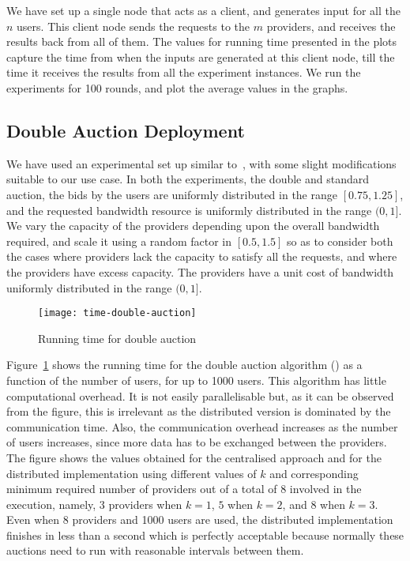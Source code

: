 We have set up a single node that acts as a client, and generates input for all the $n$ users.
This client node sends the requests to the $m$ providers, and receives the results back from all of them.
The values for running time presented in the plots capture the time from when the inputs are generated at this client node,
till the time it receives the results from all the experiment instances.
We run the experiments for 100 rounds, and plot the average values in the graphs.

\subsection{Double Auction Deployment}

We have used an experimental set up similar to~\cite{Zheng2014Star}, with some slight modifications suitable to our use case.
In both the experiments, the double and standard auction, 
the bids by the users are uniformly distributed in the range $[0.75, 1.25]$,
and the requested bandwidth resource is uniformly distributed in the range $(0, 1]$.
We vary the capacity of the providers depending upon the overall bandwidth required, and scale it using a random factor in $[0.5, 1.5]$ so as to consider both the cases where providers lack the capacity to satisfy all the requests, and where the providers have excess capacity.
The providers have a unit cost of bandwidth uniformly distributed in the range $(0, 1]$.

\begin{figure}[tbp]
	\centering
	\texttt{[image: time-double-auction]}
	\caption{Running time for double auction}
	\label{fig:double-auction-time}
\end{figure}

Figure~\ref{fig:double-auction-time} shows the running time for the double auction algorithm () 
as a function of the number of users, for up to 1000 users. 
This algorithm has little computational overhead. 
It is not easily parallelisable but, as it can be observed from the figure, this is irrelevant as the distributed version is dominated by the communication time. 
Also, the communication overhead increases as the number of users increases, since more data has to be exchanged between the providers. 
The figure shows the values obtained for the centralised approach and for the distributed implementation using different values of $k$
and corresponding minimum required number of providers out of a total of 8 involved in the execution, namely, $3$ providers when $k=1$, $5$ when $k=2$, and $8$ when $k=3$. 
Even when 8 providers and 1000 users are used, the 
distributed implementation finishes in less than a second which is perfectly 
acceptable because normally these auctions need to run with reasonable intervals between them.

